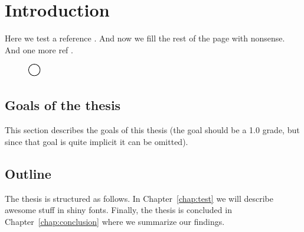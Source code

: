 \chapter{Introduction}

Here we test a reference \cite{HankersonMenezesVanstone2004}. And now we fill
the rest of the page with nonsense. And one more ref \cite{HankersonMenezesVanstone2019}.

\lipsum[1-3]

\begin{figure}
	\centering
	\includegraphics{figures/test.pdf}
\end{figure}

\section{Goals of the thesis}

This section describes the goals of this thesis (the goal should be a 1.0 grade,
but since that goal is quite implicit it can be omitted).

\section{Outline}

The thesis is structured as follows. In Chapter~\ref{chap:test} we will
describe awesome stuff in shiny fonts. Finally, the thesis is concluded in
Chapter~\ref{chap:conclusion} where we summarize our findings.
